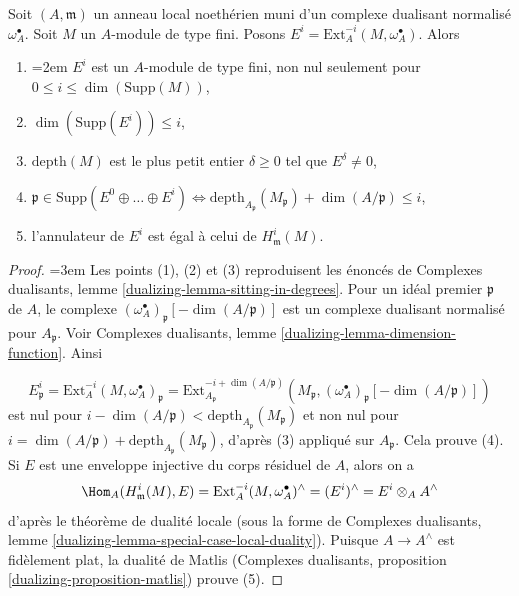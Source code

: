 \begin{lemma}
\label{lemma-sitting-in-degrees}
Soit $(A, \mathfrak m)$ un anneau local noethérien muni d'un complexe dualisant normalisé $\omega_A^\bullet$. Soit $M$ un $A$-module de type fini. Posons $E^i = \text{Ext}_A^{-i}(M, \omega_A^\bullet)$. Alors
\begin{enumerate}
\item {\emergencystretch=2em $E^i$ est un $A$-module de type fini, non nul seulement pour $0 \leq i \leq \dim(\text{Supp}(M))$,\par}
\item $\dim(\text{Supp}(E^i)) \leq i$,
\item $\text{depth}(M)$ est le plus petit entier $\delta \geq 0$ tel que $E^\delta \not = 0$,
\item $\mathfrak p \in \text{Supp}(E^0 \oplus \ldots \oplus E^i)
\Leftrightarrow
\text{depth}_{A_\mathfrak p}(M_\mathfrak p) + \dim(A/\mathfrak p) \leq i$,
\item l'annulateur de $E^i$ est égal à celui de $H^i_\mathfrak m(M)$.
\end{enumerate}
\end{lemma}

\begin{proof}
{\emergencystretch=3em
Les points (1), (2) et (3) reproduisent les énoncés de Complexes dualisants, lemme \ref{dualizing-lemma-sitting-in-degrees}. Pour un idéal premier $\mathfrak p$ de $A$, le complexe $(\omega_A^\bullet)_\mathfrak p[-\dim(A/\mathfrak p)]$ est un complexe dualisant normalisé pour $A_\mathfrak p$. Voir Complexes dualisants, lemme \ref{dualizing-lemma-dimension-function}. Ainsi
\par}
$$
E^i_\mathfrak p =
\text{Ext}^{-i}_A(M, \omega_A^\bullet)_\mathfrak p =
\text{Ext}^{-i + \dim(A/\mathfrak p)}_{A_\mathfrak p}
(M_\mathfrak p, (\omega_A^\bullet)_\mathfrak p[-\dim(A/\mathfrak p)])
$$
est nul pour $i - \dim(A/\mathfrak p) < \text{depth}_{A_\mathfrak p}(M_\mathfrak p)$ et non nul pour $i = \dim(A/\mathfrak p) + \text{depth}_{A_\mathfrak p}(M_\mathfrak p)$, d'après (3) appliqué sur $A_\mathfrak p$. Cela prouve (4). Si $E$ est une enveloppe injective du corps résiduel de $A$, alors on a
$$
\Hom_A(H^i_\mathfrak m(M), E) =
\text{Ext}^{-i}_A(M, \omega_A^\bullet)^\wedge =
(E^i)^\wedge =
E^i \otimes_A A^\wedge
$$
d'après le théorème de dualité locale (sous la forme de Complexes dualisants, lemme \ref{dualizing-lemma-special-case-local-duality}). Puisque $A \to A^\wedge$ est fidèlement plat, la dualité de Matlis (Complexes dualisants, proposition \ref{dualizing-proposition-matlis}) prouve (5).
\end{proof}






